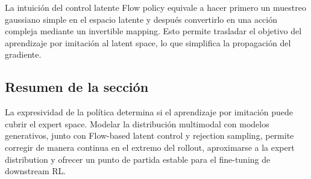 \begin{importantbox}{La intuición del control latente}
Flow policy equivale a hacer primero un muestreo gaussiano simple en el espacio latente y después convertirlo en una acción compleja mediante un invertible mapping. Esto permite trasladar el objetivo del aprendizaje por imitación al latent space, lo que simplifica la propagación del gradiente.
\end{importantbox}

\subsection{Resumen de la sección}

La expresividad de la política determina si el aprendizaje por imitación puede cubrir el expert space. Modelar la distribución multimodal con modelos generativos, junto con Flow-based latent control y rejection sampling, permite corregir de manera continua en el extremo del rollout, aproximarse a la expert distribution y ofrecer un punto de partida estable para el fine-tuning de downstream RL.


